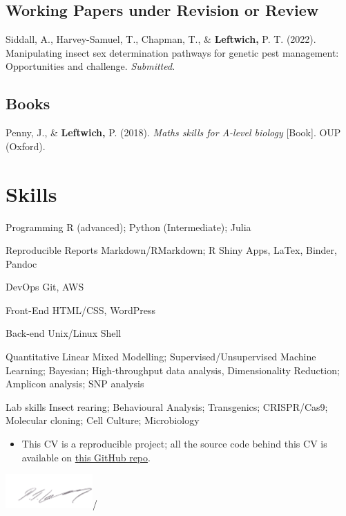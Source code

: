 \documentclass[11pt, a4paper]{awesome-cv}
\providecommand{\tightlist}{%
	\setlength{\itemsep}{0pt}\setlength{\parskip}{0pt}}
\begin{document}
\endgroup

\hypertarget{working-papers-under-revision-or-review}{%
\subsection{Working Papers under Revision or
Review}\label{working-papers-under-revision-or-review}}

\begingroup
\setlength{\parindent}{0.2in}

\hypertarget{refs_working_paper}{}
\leavevmode\hypertarget{ref-1}{}%
Siddall, A., Harvey-Samuel, T., Chapman, T., \& \textbf{Leftwich,} P. T.
(2022). Manipulating insect sex determination pathways for genetic pest
management: Opportunities and challenge. \emph{Submitted}.

\endgroup

\hypertarget{books}{%
\subsection{Books}\label{books}}

\begingroup
\setlength{\parindent}{0.2in}

\hypertarget{refs_proceedings}{}
\leavevmode\hypertarget{ref-1}{}%
Penny, J., \& \textbf{Leftwich,} P. (2018). \emph{Maths skills for
{A-level} biology} {[}Book{]}. OUP (Oxford).

\endgroup

\hypertarget{skills}{%
\section{Skills}\label{skills}}

\begin{cvskills}
  \cvskill
    {Programming}
    {R (advanced); Python (Intermediate); Julia}
    
  \cvskill
    {Reproducible Reports}
    {Markdown/RMarkdown; R Shiny Apps, LaTex, Binder, Pandoc}
   
  \cvskill
    {DevOps}
    {Git, AWS}  
    
  \cvskill
    {Front-End}
    {HTML/CSS, WordPress} 
    
  \cvskill
    {Back-end}
    {Unix/Linux Shell}
    
  \cvskill
    {Quantitative}
    {Linear Mixed Modelling; Supervised/Unsupervised Machine Learning; Bayesian; \newline High-throughput data analysis, Dimensionality Reduction; Amplicon analysis; SNP analysis}
    
  \cvskill
    {Lab skills}
    {Insect rearing; Behavioural Analysis; Transgenics; CRISPR/Cas9; Molecular cloning; \newline Cell Culture; Microbiology}
    
\end{cvskills}

\begin{itemize}
\tightlist
\item
  This CV is a reproducible project; all the source code behind this CV
  is available on \href{https://github.com/Philip-Leftwich/PL_CV}{this
  GitHub repo}.
\end{itemize}

\includegraphics[width=0.25\textwidth,height=0.1\textheight]{data/PL_sig.png}/
\end{document}
